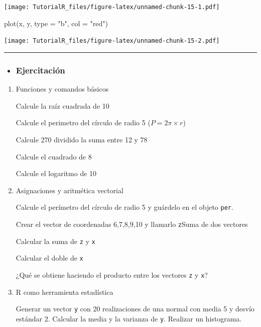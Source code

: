 \documentclass[
]{book}
\newenvironment{Shaded}{\begin{snugshade}}{\end{snugshade}}
\newcommand{\AttributeTok}[1]{\textcolor[rgb]{0.77,0.63,0.00}{#1}}
\newcommand{\FunctionTok}[1]{\textcolor[rgb]{0.00,0.00,0.00}{#1}}
\newcommand{\NormalTok}[1]{#1}
\newcommand{\StringTok}[1]{\textcolor[rgb]{0.31,0.60,0.02}{#1}}
\newenvironment{rmdblock}[1]
{\begin{shaded*}
		\begin{itemize}
			\renewcommand{\labelitemi}{
				\raisebox{-.7\height}[0pt][0pt]{
					{\setkeys{Gin}{width=3em,keepaspectratio}\texttt{[image: images/\#1]}}
				}
			}
			\item
		}
		{
		\end{itemize}
	\end{shaded*}
}
\newenvironment{rmdtip}
{\begin{rmdblock}{tip}}
	{\end{rmdblock}}
\begin{document}
\texttt{[image: TutorialR\_files/figure-latex/unnamed-chunk-15-1.pdf]}

\begin{Shaded}
\begin{Highlighting}[]
\FunctionTok{plot}\NormalTok{(x, y, }\AttributeTok{type =} \StringTok{"b"}\NormalTok{, }\AttributeTok{col =} \StringTok{"red"}\NormalTok{)}
\end{Highlighting}
\end{Shaded}

\texttt{[image: TutorialR\_files/figure-latex/unnamed-chunk-15-2.pdf]}

\begin{center}\rule{0.5\linewidth}{0.5pt}\end{center}

\begin{rmdtip}
\hypertarget{ejercitaciuxf3n}{%
\subsubsection{Ejercitación}\label{ejercitaciuxf3n}}
\end{rmdtip}

\begin{boxeda}
\begin{enumerate}
\def\labelenumi{\arabic{enumi}.}
\item
  Funciones y comandos básicos

  Calcule la raíz cuadrada de 10

  Calcule el perimetro del círculo de radio 5 (\(P = 2\pi \times r\))

  Calcule 270 dividido la suma entre 12 y 78

  Calcule el cuadrado de 8

  Calcule el logaritmo de 10
\item
  Asignaciones y aritmética vectorial

  Calcule el perímetro del círculo de radio 5 y guárdelo en el objeto
  \texttt{per}.

  Crear el vector de coordenadas 6,7,8,9,10 y llamarlo \texttt{z}Suma de
  dos vectores

  Calcular la suma de \texttt{z} y \texttt{x}

  Calcular el doble de \texttt{x}

  ¿Qué se obtiene haciendo el producto entre los vectores \texttt{z} y
  \texttt{x}?
\item
  R como herramienta estadística

  Generar un vector \texttt{y} con 20 realizaciones de una normal con
  media 5 y desvío estándar 2. Calcular la media y la varianza de
  \texttt{y}. Realizar un histograma.
\end{enumerate}
\end{boxeda}
\end{document}
